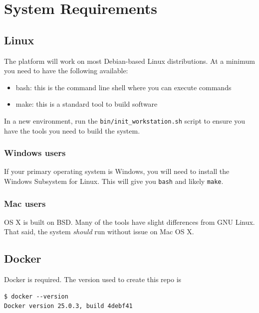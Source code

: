 \documentclass[
]{book}
\providecommand{\tightlist}{%
  \setlength{\itemsep}{0pt}\setlength{\parskip}{0pt}}
\begin{document}
\hypertarget{system-requirements}{%
\section{System Requirements}\label{system-requirements}}

\hypertarget{linux}{%
\subsection{Linux}\label{linux}}

The platform will work on most Debian-based Linux distributions.
At a minimum you need to have the following available:

\begin{itemize}
\tightlist
\item
  bash: this is the command line shell where you can execute commands
\item
  make: this is a standard tool to build software
\end{itemize}

In a new environment, run the \texttt{bin/init\_workstation.sh}
script to ensure you have the tools you need to build the system.

\hypertarget{windows-users}{%
\subsubsection{Windows users}\label{windows-users}}

If your primary operating system is Windows, you will need to install the
Windows Subsystem for Linux. This will give you \texttt{bash} and likely \texttt{make}.

\hypertarget{mac-users}{%
\subsubsection{Mac users}\label{mac-users}}

OS X is built on BSD. Many of the tools have slight differences from GNU Linux.
That said, the system \emph{should} run without issue on Mac OS X.

\hypertarget{docker}{%
\subsection{Docker}\label{docker}}

Docker is required. The version used to create this repo is

\begin{verbatim}
$ docker --version
Docker version 25.0.3, build 4debf41
\end{verbatim}
\end{document}
